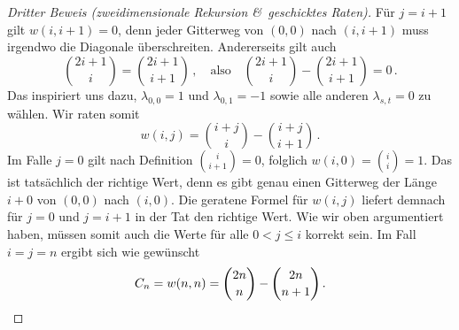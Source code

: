 \begin{proof}[Dritter Beweis \textmd{(\emph{zweidimensionale Rekursion \&\ geschicktes Raten})}]
	Für $j=i+1$ gilt $w(i,i+1)=0$, denn jeder Gitterweg von $(0,0)$ nach $(i,i+1)$ muss irgendwo die Diagonale überschreiten. Andererseits gilt auch
	\begin{equation*}
		\binom{2i+1}{i}=\binom{2i+1}{i+1}\,,\quad\text{also}\quad\binom{2i+1}{i}-\binom{2i+1}{i+1}=0\,.
	\end{equation*}
	Das inspiriert uns dazu, $\lambda_{0,0}=1$ und $\lambda_{0,1}=-1$ sowie alle anderen $\lambda_{s,t}=0$ zu wählen. Wir raten somit 
	\begin{equation*}
		w(i,j)=\binom{i+j}{i}-\binom{i+j}{i+1}\,.
	\end{equation*}
	Im Falle $j=0$ gilt nach Definition $\binom{i}{i+1}=0$, folglich $w(i,0)=\binom{i}{i}=1$. Das ist tatsächlich der richtige Wert, denn es gibt genau einen Gitterweg der Länge $i+0$ von $(0,0)$ nach $(i,0)$. Die geratene Formel für $w(i,j)$ liefert demnach für $j=0$ und $j=i+1$ in der Tat den richtige Wert. Wie wir oben argumentiert haben, müssen somit auch die Werte für alle $0<j\leqslant i$ korrekt sein. Im Fall $i=j=n$ ergibt sich wie gewünscht
	\begin{equation*}
		C_n=w(n,n)=\binom{2n}{n}-\binom{2n}{n+1}\,.\qedhere
	\end{equation*}
\end{proof}
